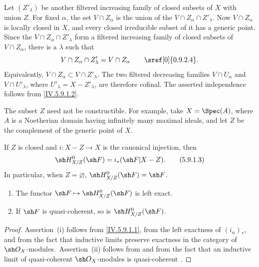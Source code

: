 Let $(Z'_\lambda)$ be another filtered increasing family of closed
subsets of $X$ with union $Z$.  For fixed $\alpha$, the set
$V\cap Z_\alpha$ is the union of the
$V\cap Z_\alpha\cap Z'_\lambda$.  Now $V\cap Z_\alpha$ is locally
closed in $X$, and every closed irreducible subset of it has a
generic point.  Since the $V\cap Z_\alpha\cap Z'_\lambda$ form a
filtered increasing family of closed subsets of $V\cap Z_\alpha$,
there is a $\lambda$ such that
\[
 V\cap Z_\alpha\cap Z'_\lambda=V\cap Z_\alpha
 \qquad\text{\sref[0]{0.9.2.4}}.
\]
Equivalently, $V\cap Z_\alpha\subset V\cap Z'_\lambda$.  The two
filtered decreasing families $V\cap U_\alpha$ and
$V\cap U'_\lambda$, where $U'_\lambda=X-Z'_\lambda$, are therefore
cofinal.  The asserted independence follows from
\eqref{IV.5.9.1.2}.


The subset $Z$ need not be constructible.  For example, take
$X=\Spec(A)$, where $A$ is a Noetherian domain having infinitely many
maximal ideals, and let $Z$ be the complement of the generic point of
$X$.

If $Z$ is closed and $i:X-Z\to X$ is the canonical injection, then
\begin{equation}
\label{IV.5.9.1.3}
 \sh H^0_{X/Z}(\sh F)=i_*(\sh F|X-Z).
\tag{5.9.1.3}
\end{equation}
In particular, when $Z=\varnothing$,
$\sh H^0_{X/Z}(\sh F)=\sh F$.

\begin{proposition}[5.9.2]
\label{IV.5.9.2}
\begin{enumerate}[{\rm(i)}]
  \item\label{IV.5.9.2.i}
    The functor $\sh F\mapsto\sh H^0_{X/Z}(\sh F)$ is left exact.
  \item\label{IV.5.9.2.ii}
    If $\sh F$ is quasi-coherent, so is
    $\sh H^0_{X/Z}(\sh F)$.
\end{enumerate}
\end{proposition}

\begin{proof}
Assertion~(i) follows from \eqref{IV.5.9.1.1}, from the left
exactness of $(i_\alpha)_*$, and from the fact that inductive limits
preserve exactness in the category of $\sh O_X$-modules.\ 
Assertion~(ii) follows from  and from the fact that
an inductive limit of quasi-coherent $\sh O_X$-modules is
quasi-coherent .
\end{proof}

